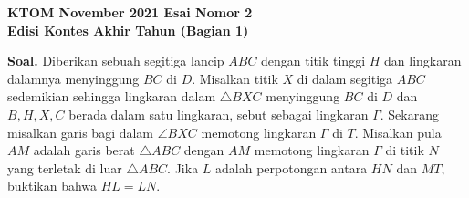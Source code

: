 \begin{center}
    \textbf{\Huge KTOM November 2021 Esai Nomor 2}\\
    \textbf{\large Edisi Kontes Akhir Tahun (Bagian 1)}
\end{center}


\noindent
 \textbf{Soal.} Diberikan sebuah segitiga lancip $ABC$ dengan titik tinggi $H$ dan lingkaran dalamnya menyinggung $BC$ di $D$. Misalkan titik $X$ di dalam segitiga $ABC$ sedemikian sehingga lingkaran dalam $\triangle BXC$ menyinggung $BC$ di $D$ dan $B,H,X,C$ berada dalam satu lingkaran, sebut sebagai lingkaran $\Gamma$.  Sekarang misalkan garis bagi dalam $\angle BXC$ memotong lingkaran $\Gamma$ di $T$. Misalkan pula $AM$ adalah garis berat $\triangle ABC$ dengan $AM$ memotong lingkaran $\Gamma$ di titik $N$ yang terletak di luar $\triangle ABC$. Jika $L$ adalah perpotongan antara $HN$ dan $MT$, buktikan bahwa $HL=LN$.	
 \newpage	

 \usetikzlibrary{arrows}
 
 
 
